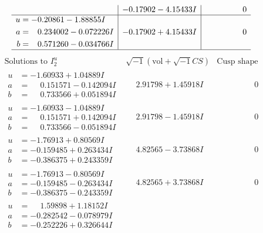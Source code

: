\documentclass[1p]{elsarticle_modified}
\theoremstyle{definition}
\newcommand{\I}{\sqrt{-1}}
\begin{document}
$$\begin{array}{c|c|c}
 & -0.17902 - 4.15433 I & \phantom{-0.000000 } 0 \\ \hline\begin{aligned}
u &= -0.20861 - 1.88855 I \\
a &= \phantom{-}0.234002 - 0.072226 I \\
b &= \phantom{-}0.571260 - 0.034766 I\end{aligned}
 & -0.17902 + 4.15433 I & \phantom{-0.000000 } 0\\
 \hline 
 \end{array}$$\newpage$$\begin{array}{c|c|c}  
\text{Solutions to }I^u_{2}& \I (\text{vol} + \sqrt{-1}CS) & \text{Cusp shape}\\
 \hline 
\begin{aligned}
u &= -1.60933 + 1.04889 I \\
a &= \phantom{-}0.151571 - 0.142094 I \\
b &= \phantom{-}0.733566 + 0.051894 I\end{aligned}
 & \phantom{-}2.91798 + 1.45918 I & \phantom{-0.000000 } 0 \\ \hline\begin{aligned}
u &= -1.60933 - 1.04889 I \\
a &= \phantom{-}0.151571 + 0.142094 I \\
b &= \phantom{-}0.733566 - 0.051894 I\end{aligned}
 & \phantom{-}2.91798 - 1.45918 I & \phantom{-0.000000 } 0 \\ \hline\begin{aligned}
u &= -1.76913 + 0.80569 I \\
a &= -0.159485 + 0.263434 I \\
b &= -0.386375 + 0.243359 I\end{aligned}
 & \phantom{-}4.82565 - 3.73868 I & \phantom{-0.000000 } 0 \\ \hline\begin{aligned}
u &= -1.76913 - 0.80569 I \\
a &= -0.159485 - 0.263434 I \\
b &= -0.386375 - 0.243359 I\end{aligned}
 & \phantom{-}4.82565 + 3.73868 I & \phantom{-0.000000 } 0 \\ \hline\begin{aligned}
u &= \phantom{-}1.59898 + 1.18152 I \\
a &= -0.282542 - 0.078979 I \\
b &= -0.252226 + 0.326644 I\end{aligned}

\end{array}$$
\end{document}
